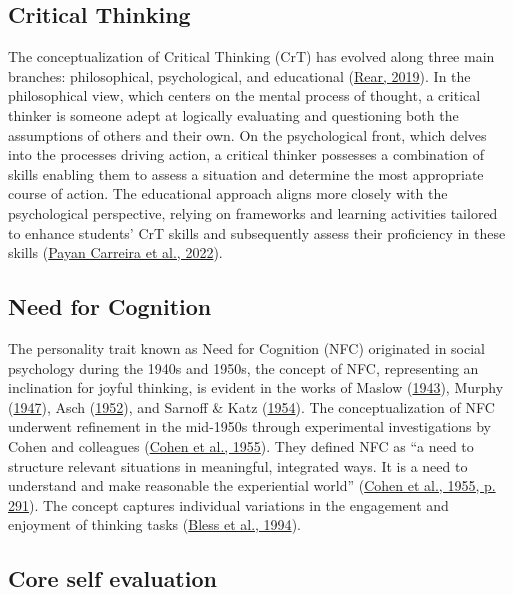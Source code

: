 \documentclass[
  12pt,
  a4paper,
  twoside]{article}
\begin{document}
\hypertarget{critical-thinking}{%
\subsection{Critical Thinking}\label{critical-thinking}}

The conceptualization of Critical Thinking (CrT) has evolved along three main branches: philosophical, psychological, and educational (\protect\hyperlink{ref-rear2019}{Rear, 2019}). In the philosophical view, which centers on the mental process of thought, a critical thinker is someone adept at logically evaluating and questioning both the assumptions of others and their own. On the psychological front, which delves into the processes driving action, a critical thinker possesses a combination of skills enabling them to assess a situation and determine the most appropriate course of action. The educational approach aligns more closely with the psychological perspective, relying on frameworks and learning activities tailored to enhance students' CrT skills and subsequently assess their proficiency in these skills (\protect\hyperlink{ref-payan2022}{Payan Carreira et al., 2022}).

\hypertarget{need-for-cognition}{%
\subsection{Need for Cognition}\label{need-for-cognition}}

The personality trait known as Need for Cognition (NFC) originated in social psychology during the 1940s and 1950s, the concept of NFC, representing an inclination for joyful thinking, is evident in the works of Maslow (\protect\hyperlink{ref-maslow1943}{1943}), Murphy (\protect\hyperlink{ref-murphy1947}{1947}), Asch (\protect\hyperlink{ref-asch1952}{1952}), and Sarnoff \& Katz (\protect\hyperlink{ref-sarnoff1954}{1954}). The conceptualization of NFC underwent refinement in the mid-1950s through experimental investigations by Cohen and colleagues (\protect\hyperlink{ref-cohen1955}{Cohen et al., 1955}). They defined NFC as ``a need to structure relevant situations in meaningful, integrated ways. It is a need to understand and make reasonable the experiential world'' (\protect\hyperlink{ref-cohen1955}{Cohen et al., 1955, p. 291}). The concept captures individual variations in the engagement and enjoyment of thinking tasks (\protect\hyperlink{ref-bless1994}{Bless et al., 1994}).

\hypertarget{core-self-evaluation}{%
\subsection{Core self evaluation}\label{core-self-evaluation}}
\end{document}
